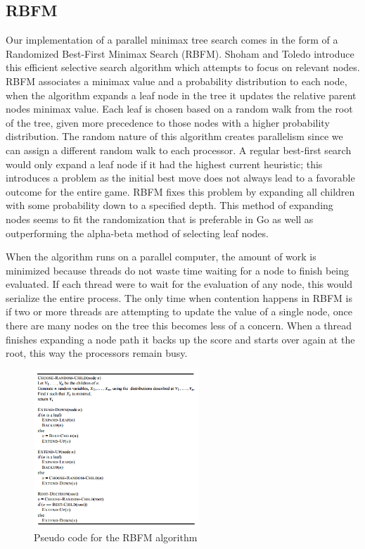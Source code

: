 \documentclass[conference]{IEEEtran}
\begin{document}
\subsection{RBFM}
Our implementation of a parallel minimax tree search comes in the form of a Randomized Best-First Minimax Search (RBFM). Shoham and Toledo introduce this efficient selective search algorithm which attempts to focus on relevant nodes. RBFM associates a minimax value and a probability distribution to each node, when the algorithm expands a leaf node in the tree it updates the relative parent nodes minimax value. Each leaf is chosen based on a random walk from the root of the tree, given more precedence to those nodes with a higher probability distribution. The random nature of this algorithm creates parallelism since we can assign a different random walk to each processor. A regular best-first search would only expand a leaf node if it had the highest current heuristic; this introduces a problem as the initial best move does not always lead to a favorable outcome for the entire game. RBFM fixes this problem by expanding all children with some probability down to a specified depth.  This method of expanding nodes seems to fit the randomization that is preferable in Go as well as outperforming the alpha-beta method of selecting leaf nodes.\par
When the algorithm runs on a parallel computer, the amount of work is minimized because threads do not waste time waiting for a node to finish being evaluated. If each thread were to wait for the evaluation of any node, this would serialize the entire process. The only time when contention happens in RBFM is if two or more threads are attempting to update the value of a single node, once there are many nodes on the tree this becomes less of a concern. When a thread finishes expanding a node path it backs up the score and starts over again at the root, this way the processors remain busy.

\begin{figure}[h]
\includegraphics[width=235px]{RBFM}
\caption{Pseudo code for the RBFM algorithm}
\centering
\end{figure}
\end{document}
